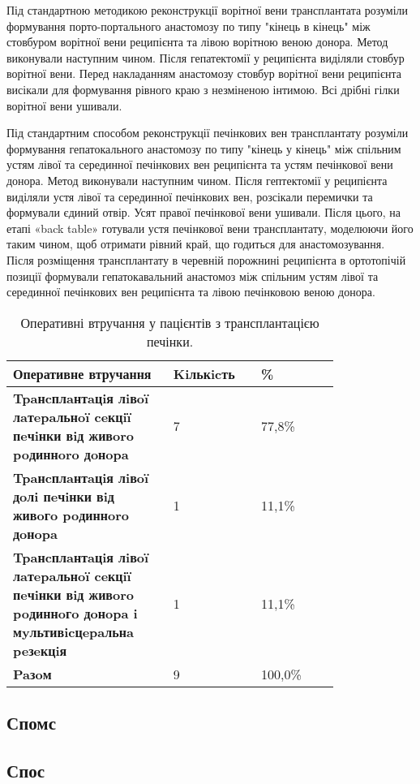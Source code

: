 Під стандартною методикою реконструкції ворітної вени трансплантата розуміли формування порто-портального анастомозу по типу "кінець в кінець" між стовбуром ворітної вени реципієнта та лівою ворітною веною донора. Метод виконували наступним чином. Після гепатектомії у реципієнта виділяли стовбур ворітної вени. Перед накладанням анастомозу стовбур ворітної вени реципієнта висікали для формування рівного краю з незміненою інтимою. Всі дрібні гілки ворітної вени ушивали. 

Під стандартним способом реконструкції печінкових вен трансплантату розуміли формування гепатокального анастомозу по типу "кінець у кінець" між спільним устям лівої та серединної печінкових вен реципієнта та устям печінкової вени донора. Метод виконували наступним чином. Після гептектомії у реципієнта виділяли устя лівої та серединної печінкових вен, розсікали перемички та формували єдиний отвір. Усят правої печінкової вени ушивали. Після цього, на етапі «back table» готували устя печінкової вени трансплантату, моделюючи його таким чином, щоб отримати рівний край, що годиться для анастомозування. Після розміщення трансплантату в черевній порожнині реципієнта в ортотопічій позиції формували гепатокавальний анастомоз між спільним устям лівої та серединної печінкових вен реципієнта та лівою печінковою веною донора.

\begin{table}[]
\centering
\caption{Оперативні втручання у пацієнтів з трансплантацією печінки.}
\label{tab:ldlt}
\begin{tabular}{|p{0.4\linewidth}|
                 p{0.2\linewidth}|
                 p{0.2\linewidth}|}
\hline
\textbf{Оперативне втручання} &
\textbf{Kiлькicть} &
  \textbf{\%} \\ \hline
\textbf{Tpaнcплaнтaцiя лiвoï лaтepaльнoï ceкцiï пeчiнки вiд живoro poдиннoro дoнopa} & 7 & 77,8\%  \\ \hline
\textbf{Tpaнcплaнтaцiя лiвoï дoлi пeчiнки вiд живoгo poдиннoro дoнopa}               & 1 & 11,1\%  \\ \hline
\textbf{Tpaнcплaнтaцiя лiвoï лaтepaльнoï ceкцiï пeчiнки вiд живoro poдиннoгo дoнopa i мyльтивicцepaльнa peзeкцiя} &
  1 &
  11,1\% \\ \hline
\textbf{Paзoм}                                                                       & 9 & 100,0\% \\ \hline
\end{tabular}
\end{table}








\subsection{Спомс}

\subsection{Спос}

